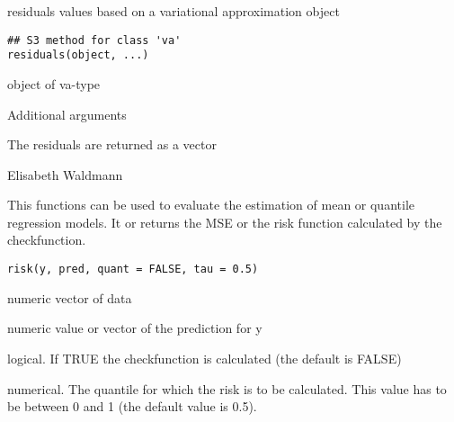 \documentclass[a4paper]{book}
\begin{document}
%
\begin{Description}\relax
residuals values based on a variational approximation object
\end{Description}
%
\begin{Usage}
\begin{verbatim}
## S3 method for class 'va'
residuals(object, ...)
\end{verbatim}
\end{Usage}
%
\begin{Arguments}
\begin{ldescription}
\item[\code{object}] 
object of va-type
\item[\code{...}] Additional arguments
\end{ldescription}
\end{Arguments}
%
\begin{Value}
The residuals are returned as a vector
\end{Value}
%
\begin{Author}\relax
Elisabeth Waldmann \\{}
\end{Author}
%
\begin{Description}\relax
This functions can be used to evaluate the estimation of mean or quantile regression models. It or returns the MSE or the risk function calculated by the checkfunction.

\end{Description}
%
\begin{Usage}
\begin{verbatim}
risk(y, pred, quant = FALSE, tau = 0.5)
\end{verbatim}
\end{Usage}
%
\begin{Arguments}
\begin{ldescription}
\item[\code{y}] 
numeric vector of data  


\item[\code{pred}] 
numeric value or vector of the prediction for y


\item[\code{quant}] 
logical. If TRUE the checkfunction is calculated (the default is FALSE)


\item[\code{tau}] 
numerical. The quantile for which the risk is to be calculated. This value has to be between 0 and 1 (the default value is 0.5).


\end{ldescription}
\end{Arguments}
\end{document}
